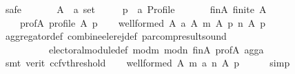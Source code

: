\begin{isabellebody}
\isamarkupfalse%
\ {\isacharparenleft}{\kern0pt}safe{\isacharparenright}{\kern0pt}\isanewline
\ \ \isamarkupfalse%
\isanewline
\ \ \ \ A\ {\isacharcolon}{\kern0pt}{\isacharcolon}{\kern0pt}\ {\isachardoublequoteopen}{\isacharprime}{\kern0pt}a\ set{\isachardoublequoteclose}\ \isanewline
\ \ \ \ p\ {\isacharcolon}{\kern0pt}{\isacharcolon}{\kern0pt}\ {\isachardoublequoteopen}{\isacharprime}{\kern0pt}a\ Profile{\isachardoublequoteclose}\isanewline
\ \ \isamarkupfalse%
\isanewline
\ \ \ \ fin{\isacharunderscore}{\kern0pt}A{\isacharcolon}{\kern0pt}\ {\isachardoublequoteopen}finite\ A{\isachardoublequoteclose}\ \isanewline
\ \ \ \ prof{\isacharunderscore}{\kern0pt}A{\isacharcolon}{\kern0pt}\ {\isachardoublequoteopen}profile\ A\ p{\isachardoublequoteclose}\isanewline
\ \ \isamarkupfalse%
\ {\isachardoublequoteopen}well{\isacharunderscore}{\kern0pt}formed\ A\ {\isacharparenleft}{\kern0pt}a\ A\ {\isacharparenleft}{\kern0pt}m\ A\ p{\isacharparenright}{\kern0pt}\ {\isacharparenleft}{\kern0pt}n\ A\ p{\isacharparenright}{\kern0pt}{\isacharparenright}{\kern0pt}{\isachardoublequoteclose}\isanewline
\ \ \ \ \isamarkupfalse%
\ aggregator{\isacharunderscore}{\kern0pt}def\ combine{\isacharunderscore}{\kern0pt}ele{\isacharunderscore}{\kern0pt}rej{\isacharunderscore}{\kern0pt}def\ par{\isacharunderscore}{\kern0pt}comp{\isacharunderscore}{\kern0pt}result{\isacharunderscore}{\kern0pt}sound\isanewline
\ \ \ \ \ \ \ \ \ \ electoral{\isacharunderscore}{\kern0pt}module{\isacharunderscore}{\kern0pt}def\ mod{\isacharunderscore}{\kern0pt}m\ mod{\isacharunderscore}{\kern0pt}n\ fin{\isacharunderscore}{\kern0pt}A\ prof{\isacharunderscore}{\kern0pt}A\ agg{\isacharunderscore}{\kern0pt}a\isanewline
\ \ \ \ \isamarkupfalse%
\ {\isacharparenleft}{\kern0pt}smt\ {\isacharparenleft}{\kern0pt}verit{\isacharcomma}{\kern0pt}\ ccfv{\isacharunderscore}{\kern0pt}threshold{\isacharparenright}{\kern0pt}{\isacharparenright}{\kern0pt}\isanewline
\ \ \isamarkupfalse%
\ {\isachardoublequoteopen}well{\isacharunderscore}{\kern0pt}formed\ A\ {\isacharparenleft}{\kern0pt}{\isacharparenleft}{\kern0pt}m\ {\isasymparallel}\isactrlsub a\ n{\isacharparenright}{\kern0pt}\ A\ p{\isacharparenright}{\kern0pt}{\isachardoublequoteclose}\isanewline
\ \ \ \ \isamarkupfalse%
\ simp\isanewline
{}\isamarkupfalse%
%
\endisatagproof
{\isafoldproof}%
%
\isadelimproof
%
\endisadelimproof
%
\isadelimdocument
%
\endisadelimdocument
%
\isatagdocument
%
\end{isabellebody}
